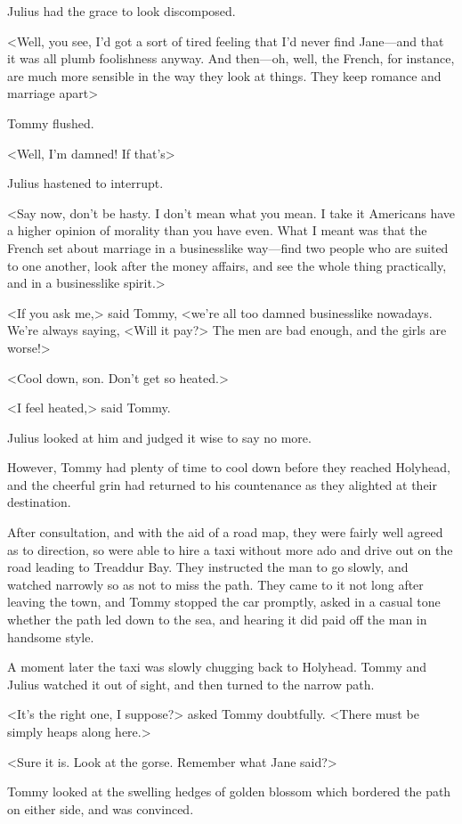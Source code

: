 Julius had the grace to look discomposed.

<Well, you see, I'd got a sort of tired feeling that I'd never find Jane—and that it was all plumb foolishness anyway. And then—oh, well, the French, for instance, are much more sensible in the way they look at things. They keep romance and marriage apart\longdash>

Tommy flushed.

<Well, I'm damned! If that's\longdash>

Julius hastened to interrupt.

<Say now, don't be hasty. I don't mean what you mean. I take it Americans have a higher opinion of morality than you have even. What I meant was that the French set about marriage in a businesslike way—find two people who are suited to one another, look after the money affairs, and see the whole thing practically, and in a businesslike spirit.>

<If you ask me,> said Tommy, <we're all too damned businesslike nowadays. We're always saying, <Will it pay?> The men are bad enough, and the girls are worse!>

<Cool down, son. Don't get so heated.>

<I feel heated,> said Tommy.

Julius looked at him and judged it wise to say no more.

However, Tommy had plenty of time to cool down before they reached Holyhead, and the cheerful grin had returned to his countenance as they alighted at their destination.

After consultation, and with the aid of a road map, they were fairly well agreed as to direction, so were able to hire a taxi without more ado and drive out on the road leading to Treaddur Bay. They instructed the man to go slowly, and watched narrowly so as not to miss the path. They came to it not long after leaving the town, and Tommy stopped the car promptly, asked in a casual tone whether the path led down to the sea, and hearing it did paid off the man in handsome style.

A moment later the taxi was slowly chugging back to Holyhead. Tommy and Julius watched it out of sight, and then turned to the narrow path.

<It's the right one, I suppose?> asked Tommy doubtfully. <There must be simply heaps along here.>

<Sure it is. Look at the gorse. Remember what Jane said?>

Tommy looked at the swelling hedges of golden blossom which bordered the path on either side, and was convinced.

